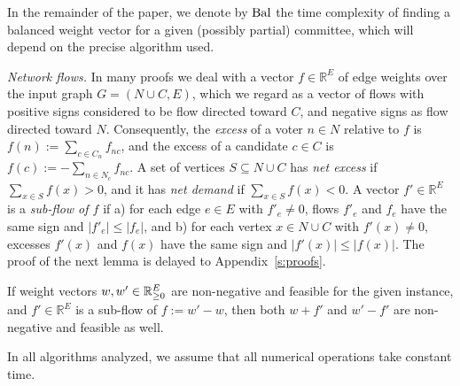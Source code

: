 \begin{remark}\label{rem:bal}
In the remainder of the paper, we denote by $\operatorname{Bal}$ the time complexity of finding a balanced weight vector for a given (possibly partial) committee, which will depend on the precise algorithm used.
\end{remark}


\emph{Network flows.}
In many proofs we deal with a vector $f\in\mathbb{R}^{E}$ of edge weights over the input graph $G=(N\cup C,E)$, which we regard as a vector of flows with positive signs considered to be flow directed toward $C$, and negative signs as flow directed toward $N$. 
Consequently, the \emph{excess} of a voter $n\in N$ relative to $f$ is $f(n):=\sum_{c\in C_n} f_{nc}$, and the excess of a candidate $c\in C$ is $f(c):= -\sum_{n\in N_c} f_{nc}$. 
A set of vertices $S\subseteq N\cup C$ has \emph{net excess} if $\sum_{x\in S} f(x)>0$, and it has \emph{net demand} if $\sum_{x\in S} f(x)<0$.    
A vector $f'\in\mathbb{R}^E$ is a \emph{sub-flow of $f$} if a) for each edge $e\in E$ with $f'_e\neq 0$, flows $f'_e$ and $f_e$ have the same sign and $|f'_e|\leq |f_e|$, and b) for each vertex $x\in N\cup C$ with $f'(x)\neq 0$, excesses $f'(x)$ and $f(x)$ have the same sign and $|f'(x)|\leq |f(x)|$. 
The proof of the next lemma is delayed to Appendix~\ref{s:proofs}.

\begin{lemma}\label{lem:subflow}
If weight vectors $w, w'\in\mathbb{R}_{\geq 0}^E$ are non-negative and feasible for the given instance, and $f'\in\mathbb{R}^E$ is a sub-flow of $f:=w'-w$, then both $w+f'$ and $w'-f'$ are non-negative and feasible as well.
\end{lemma}

\begin{remark}
In all algorithms analyzed, we assume that all numerical operations take constant time.
\end{remark}
